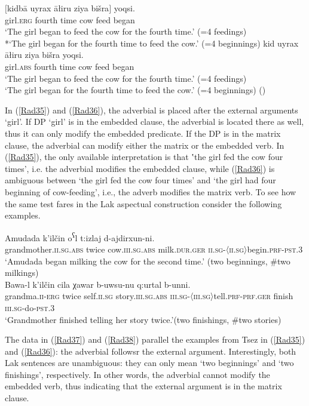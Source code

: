 \documentclass[output=paper]{langscibook}
\begin{document}
\ea\label{Rad35}
\gll $[$kidbā uyrax āłiru ziya bišra$]$ yoqsi.\\
 girl.\textsc{erg} fourth time cow feed began\\
\glt ‘The girl began to feed the cow for the fourth time.’ (=4 feedings)\\
*‘The girl began for the fourth time to feed the cow.’ (=4 beginnings)
\ex\label{Rad36}
\gll kid uyrax āłiru ziya bišra yoqsi.\\
girl.\textsc{abs} fourth time cow feed began\\
\glt ‘The girl began to feed the cow for the fourth time.’ (=4 feedings)\\
‘The girl began for the fourth time to feed the cow.’ (=4 beginnings) (\citealt[255]{PolinskyPotsdam2002})
\z 

In (\ref{Rad35}) and (\ref{Rad36}), the adverbial is placed after the external arguments ‘girl’. If DP ‘girl’ is in the embedded clause, the adverbial is located there as well, thus it can only modify the embedded predicate. If the DP is in the matrix clause, the adverbial can modify either the matrix or the embedded verb. In (\ref{Rad35}), the only available interpretation is that ‛the girl fed the cow four times’, i.e. the adverbial modifies the embedded clause, while (\ref{Rad36}) is ambiguous between ‘the girl fed the cow four times’ and ‘the girl had four beginning of cow-feeding’, i.e., the adverb modifies the matrix verb. To see how the same test fares in the Lak aspectual construction consider the following examples.

\ea\label{Rad37}
\gll Amudada k’ilčin o\textsuperscript{ʕ}l t:izlaj d-ajdirxun-ni.\\
grandmother.\textsc{ii.sg.abs} twice cow.\textsc{iii.sg.abs} milk.\textsc{dur.ger} \textsc{ii.sg-〈ii.sg〉}begin.\textsc{prf-pst.3}\\
\glt ‘Amudada began milking the cow for the second time.’ (two beginnings, \#two milkings)\\
\ex\label{Rad38}
\gll Bawa-l k’ilčin cila χawar b-uwsu-nu q:urtal b-unni.\\
grandma.\textsc{ii-erg} twice self.\textsc{ii.sg} story.\textsc{iii.sg.abs} \textsc{iii.sg-〈iii.sg〉}tell.\textsc{prf-prf.ger} finish 	\textsc{iii.sg}-do-\textsc{pst.3}\\
\glt ‘Grandmother finished telling her story twice.’(two finishings, \#two stories)\\
\z 

The data in (\ref{Rad37}) and (\ref{Rad38}) parallel the examples from Tsez in (\ref{Rad35}) and (\ref{Rad36}): the adverbial followsr the external argument.  Interestingly, both Lak sentences are unambiguous: they can only mean ‘two beginnings’ and ‘two finishings’, respectively. In other words, the adverbial cannot modify the embedded verb, thus indicating that the external argument is in the matrix clause. 
\end{document}
